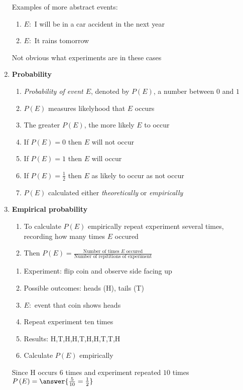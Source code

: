 \documentclass{ximera}
\begin{document}
\begin{enumerate}
\begin{example}
Examples of more abstract events:
\begin{enumerate}
\item $E:$ I will be in a car accident in the next year
\item $E:$ It rains tomorrow
\end{enumerate}
Not obvious what experiments are in these cases
\end{example}

\item{\bf Probability}
\begin{enumerate}
\item {\em Probability of event $E$}, denoted by $P\left(E\right)$,
a number between $0$ and $1$
\item $P\left(E\right)$ measures likelyhood that $E$ occurs
\item The greater $P\left(E\right)$, the more likely $E$ to occur
\item If $P\left(E\right)=0$ then $E$ will not occur
\item If $P\left(E\right)=1$ then $E$ will occur
\item If $P\left(E\right)=\frac{1}{2}$ then $E$ 
as likely to occur as not occur
\item $P\left(E\right)$ calculated either {\em theoretically}
or {\em empirically}
\end{enumerate}


\item{\bf Empirical probability}
\begin{enumerate}
\item To calculate $P\left(E\right)$ empirically
repeat experiment several times, recording how
many times $E$ occured
\item Then $P\left(E\right)=
\frac{\text{Number of times $E$ occured}}
{\text{Number of repititions of experiment}}$
\end{enumerate}

\begin{question}
\begin{enumerate}
\item Experiment: flip coin and observe side facing up
\item Possible outcomes: heads (H), tails (T)
\item $E:$ event that coin shows heads
\item Repeat experiment ten times
\item Results: H,T,H,H,T,H,H,T,T,H
\item Calculate $P\left(E\right)$ empirically
\end{enumerate}
\begin{solution} Since H occurs $6$ times
and experiment repeated $10$ times
$P\left(E\right)=\answer{\frac{5}{10}=\frac{1}{2}}$
\end{solution}
\end{question}

\end{enumerate}
\end{document}

